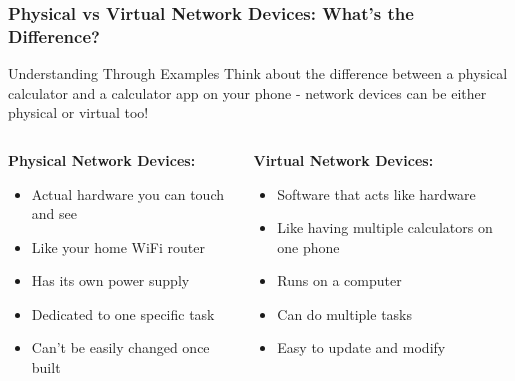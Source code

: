 \documentclass{beamer}
\begin{document}
\begin{frame}
    \frametitle{Physical vs Virtual Network Devices: What's the Difference?}
    
    \begin{block}{Understanding Through Examples}
        Think about the difference between a physical calculator and a calculator app on your phone - network devices can be either physical or virtual too!
    \end{block}
    
    \begin{columns}[t]
        \begin{column}{0.5\textwidth}
            \textbf{Physical Network Devices:}
            \begin{itemize}
                \item Actual hardware you can touch and see
                \item Like your home WiFi router
                \item Has its own power supply
                \item Dedicated to one specific task
                \item Can't be easily changed once built
            \end{itemize}
        \end{column}
        
        \begin{column}{0.5\textwidth}
            \textbf{Virtual Network Devices:}
            \begin{itemize}
                \item Software that acts like hardware
                \item Like having multiple calculators on one phone
                \item Runs on a computer
                \item Can do multiple tasks
                \item Easy to update and modify
            \end{itemize}
        \end{column}
    \end{columns}
\end{frame}
\end{document}
